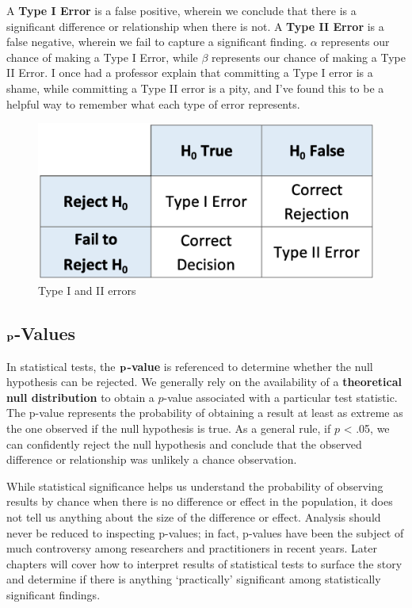 \documentclass[
]{book}
\begin{document}
A \textbf{Type I Error} is a false positive, wherein we conclude that there is a significant difference or relationship when there is not. A \textbf{Type II Error} is a false negative, wherein we fail to capture a significant finding. \(\alpha\) represents our chance of making a Type I Error, while \(\beta\) represents our chance of making a Type II Error. I once had a professor explain that committing a Type I error is a shame, while committing a Type II error is a pity, and I've found this to be a helpful way to remember what each type of error represents.

\begin{figure}

{\centering \includegraphics[width=0.5\linewidth]{graphics/hypothesis_testing_errors} 

}

\caption{Type I and II errors}\label{fig:hyp-errs}
\end{figure}

\hypertarget{textbf-p-values}{%
\subsection{\texorpdfstring{\(\textbf p\)-Values}{\textbackslash textbf p-Values}}\label{textbf-p-values}}

In statistical tests, the \(\textbf p\)\textbf{-value} is referenced to determine whether the null hypothesis can be rejected. We generally rely on the availability of a \textbf{theoretical null distribution} to obtain a \(p\)-value associated with a particular test statistic. The p-value represents the probability of obtaining a result at least as extreme as the one observed if the null hypothesis is true. As a general rule, if \(p\) \textless{} .05, we can confidently reject the null hypothesis and conclude that the observed difference or relationship was unlikely a chance observation.

While statistical significance helps us understand the probability of observing results by chance when there is no difference or effect in the population, it does not tell us anything about the size of the difference or effect. Analysis should never be reduced to inspecting p-values; in fact, p-values have been the subject of much controversy among researchers and practitioners in recent years. Later chapters will cover how to interpret results of statistical tests to surface the story and determine if there is anything `practically' significant among statistically significant findings.
\end{document}

